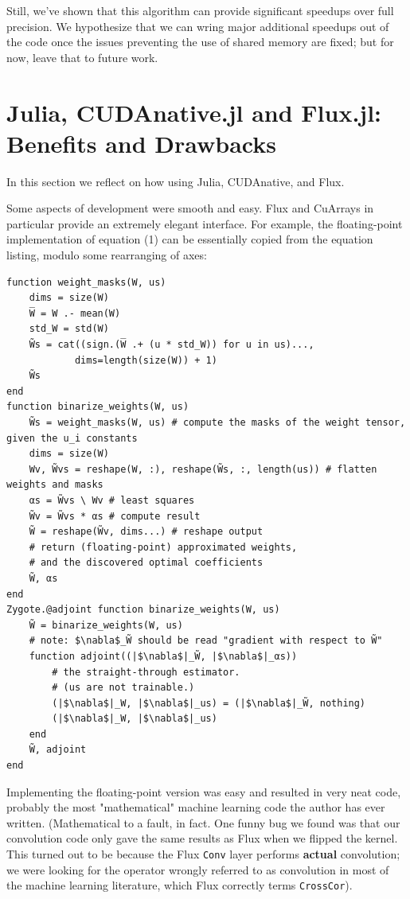 \documentclass[12pt]{article}
\begin{document}
Still, we've shown that this algorithm can provide significant speedups over full precision. We hypothesize that we can wring major additional speedups out of the code once the issues preventing the use of shared memory are fixed; but for now, leave that to future work.

\section{Julia, CUDAnative.jl and Flux.jl: Benefits and Drawbacks}
\label{sec:orge49cc42}
In this section we reflect on how using Julia, CUDAnative, and Flux.

Some aspects of development were smooth and easy. Flux and CuArrays in particular provide an extremely elegant interface. For example, the floating-point implementation of equation (1) can be essentially copied from the equation listing, modulo some rearranging of axes:
\begin{verbatim}
function weight_masks(W, us)
    dims = size(W)
    W̅ = W .- mean(W)
    std_W = std(W)
    W̃s = cat((sign.(W̅ .+ (u * std_W)) for u in us)...,
            dims=length(size(W)) + 1)
    W̃s
end
function binarize_weights(W, us)
    W̃s = weight_masks(W, us) # compute the masks of the weight tensor, given the u_i constants
    dims = size(W)
    Wv, W̃vs = reshape(W, :), reshape(W̃s, :, length(us)) # flatten weights and masks
    αs = W̃vs \ Wv # least squares
    W̃v = W̃vs * αs # compute result
    W̃ = reshape(W̃v, dims...) # reshape output
    # return (floating-point) approximated weights,
    # and the discovered optimal coefficients
    W̃, αs
end
Zygote.@adjoint function binarize_weights(W, us)
    W̃ = binarize_weights(W, us)
    # note: $\nabla$_W̃ should be read "gradient with respect to W̃"
    function adjoint((|$\nabla$|_W̃, |$\nabla$|_αs))
        # the straight-through estimator.
        # (us are not trainable.)
        (|$\nabla$|_W, |$\nabla$|_us) = (|$\nabla$|_W̃, nothing)
        (|$\nabla$|_W, |$\nabla$|_us)
    end
    W̃, adjoint
end
\end{verbatim}

Implementing the floating-point version was easy and resulted in very neat code, probably the most "mathematical" machine learning code the author has ever written. (Mathematical to a fault, in fact. One funny bug we found was that our convolution code only gave the same results as Flux when we flipped the kernel. This turned out to be because the Flux \texttt{Conv} layer performs \textbf{actual} convolution; we were looking for the operator wrongly referred to as convolution in most of the machine learning literature, which Flux correctly terms \texttt{CrossCor}).
\end{document}
